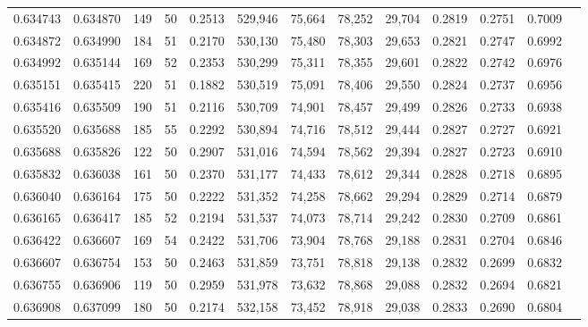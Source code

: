 \begin{tabular}{rrrrrrrrrrrrr}
0.634743 & 0.634870 &   149 &  50 &                                     0.2513 & 529,946 &  75,664 &  78,252 &  29,704 & 0.2819 & 0.2751 & 0.7009 \\
0.634872 & 0.634990 &   184 &  51 &                                     0.2170 & 530,130 &  75,480 &  78,303 &  29,653 & 0.2821 & 0.2747 & 0.6992 \\
0.634992 & 0.635144 &   169 &  52 &                                     0.2353 & 530,299 &  75,311 &  78,355 &  29,601 & 0.2822 & 0.2742 & 0.6976 \\
0.635151 & 0.635415 &   220 &  51 &                                     0.1882 & 530,519 &  75,091 &  78,406 &  29,550 & 0.2824 & 0.2737 & 0.6956 \\
0.635416 & 0.635509 &   190 &  51 &                                     0.2116 & 530,709 &  74,901 &  78,457 &  29,499 & 0.2826 & 0.2733 & 0.6938 \\
0.635520 & 0.635688 &   185 &  55 &                                     0.2292 & 530,894 &  74,716 &  78,512 &  29,444 & 0.2827 & 0.2727 & 0.6921 \\
0.635688 & 0.635826 &   122 &  50 &                                     0.2907 & 531,016 &  74,594 &  78,562 &  29,394 & 0.2827 & 0.2723 & 0.6910 \\
0.635832 & 0.636038 &   161 &  50 &                                     0.2370 & 531,177 &  74,433 &  78,612 &  29,344 & 0.2828 & 0.2718 & 0.6895 \\
0.636040 & 0.636164 &   175 &  50 &                                     0.2222 & 531,352 &  74,258 &  78,662 &  29,294 & 0.2829 & 0.2714 & 0.6879 \\
0.636165 & 0.636417 &   185 &  52 &                                     0.2194 & 531,537 &  74,073 &  78,714 &  29,242 & 0.2830 & 0.2709 & 0.6861 \\
0.636422 & 0.636607 &   169 &  54 &                                     0.2422 & 531,706 &  73,904 &  78,768 &  29,188 & 0.2831 & 0.2704 & 0.6846 \\
0.636607 & 0.636754 &   153 &  50 &                                     0.2463 & 531,859 &  73,751 &  78,818 &  29,138 & 0.2832 & 0.2699 & 0.6832 \\
0.636755 & 0.636906 &   119 &  50 &                                     0.2959 & 531,978 &  73,632 &  78,868 &  29,088 & 0.2832 & 0.2694 & 0.6821 \\
0.636908 & 0.637099 &   180 &  50 &                                     0.2174 & 532,158 &  73,452 &  78,918 &  29,038 & 0.2833 & 0.2690 & 0.6804 \\

\end{tabular}

